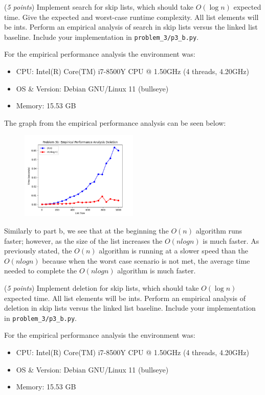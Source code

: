 \documentclass{hw}
\begin{document}
\begin{problem}
\begin{subproblem}
(\textit{5 points}) Implement search for skip lists, which should take $O(\log n)$ expected time.
Give the expected and worst-case runtime complexity.
All list elements will be ints.
Perform an empirical analysis of search in skip lists versus the linked list baseline.
Include your implementation in \texttt{problem\_3/p3\_b.py}.
\end{subproblem}
\begin{solution}
For the empirical performance analysis the environment was:
        \begin{itemize}
            \item CPU: Intel(R) Core(TM) i7-8500Y CPU @ 1.50GHz (4 threads, 4.20GHz)
            \item OS \& Version: Debian GNU/Linux 11 (bullseye)
            \item Memory: 15.53 GB
        \end{itemize}
            
        The graph from the empirical performance analysis can be seen below:
\begin{figure}[ht]
  \centering
      \includegraphics[width=0.5\textwidth]{figures/problem-3c.png}
\end{figure}

Similarly to part b, we see that at the beginning the $O(n)$ algorithm runs faster; however, as the size of the list increases the $O(nlogn)$ is much faster. As previously stated, the $O(n)$ algorithm is running at a slower speed than the $O(nlogn)$ because when the worst case scenario is not met, the average time needed to complete the $O(nlogn)$ algorithm is much faster.
\end{solution}


\begin{subproblem}
(\textit{5 points}) Implement deletion for skip lists, which should take $O(\log n)$ expected time.
All list elements will be ints.
Perform an empirical analysis of deletion in skip lists versus the linked list baseline.
Include your implementation in \texttt{problem\_3/p3\_b.py}.
\end{subproblem}
\begin{solution}
For the empirical performance analysis the environment was:
        \begin{itemize}
            \item CPU: Intel(R) Core(TM) i7-8500Y CPU @ 1.50GHz (4 threads, 4.20GHz)
            \item OS \& Version: Debian GNU/Linux 11 (bullseye)
            \item Memory: 15.53 GB
        \end{itemize}
            

\end{solution}
\end{problem}
\end{document}

